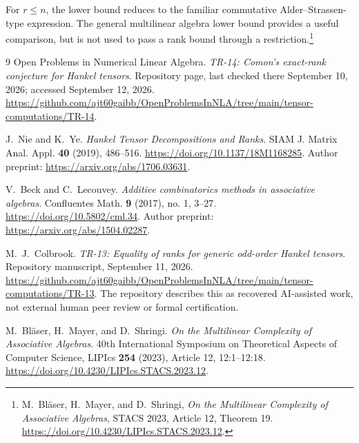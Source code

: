 \documentclass[11pt]{article}
\theoremstyle{definition}
\theoremstyle{remark}
\begin{document}
For $r\le n$, the lower bound reduces to the familiar commutative
Alder--Strassen-type expression. The general multilinear algebra lower bound
provides a useful comparison, but is not used to pass a rank bound through a
restriction.\footnote{M.~Bl\"aser, H.~Mayer, and D.~Shringi,
\emph{On the Multilinear Complexity of Associative Algebras}, STACS 2023,
Article 12, Theorem 19. \url{https://doi.org/10.4230/LIPIcs.STACS.2023.12}.}

\begin{thebibliography}{9}
Open Problems in Numerical Linear Algebra.
\emph{TR-14: Comon's exact-rank conjecture for Hankel tensors}.
Repository page, last checked there September 10, 2026; accessed September 12, 2026.
\url{https://github.com/ajt60gaibb/OpenProblemsInNLA/tree/main/tensor-computations/TR-14}.

J.~Nie and K.~Ye.
\emph{Hankel Tensor Decompositions and Ranks}.
SIAM J. Matrix Anal. Appl. \textbf{40} (2019), 486--516.
\url{https://doi.org/10.1137/18M1168285}.
Author preprint: \url{https://arxiv.org/abs/1706.03631}.

V.~Beck and C.~Lecouvey.
\emph{Additive combinatorics methods in associative algebras}.
Confluentes Math. \textbf{9} (2017), no. 1, 3--27.
\url{https://doi.org/10.5802/cml.34}.
Author preprint: \url{https://arxiv.org/abs/1504.02287}.

M.~J.~Colbrook.
\emph{TR-13: Equality of ranks for generic odd-order Hankel tensors}.
Repository manuscript, September 11, 2026.
\url{https://github.com/ajt60gaibb/OpenProblemsInNLA/tree/main/tensor-computations/TR-13}.
The repository describes this as recovered AI-assisted work, not external
human peer review or formal certification.

M.~Bl\"aser, H.~Mayer, and D.~Shringi.
\emph{On the Multilinear Complexity of Associative Algebras}.
40th International Symposium on Theoretical Aspects of Computer Science,
LIPIcs \textbf{254} (2023), Article 12, 12:1--12:18.
\url{https://doi.org/10.4230/LIPIcs.STACS.2023.12}.
\end{thebibliography}
\end{document}
